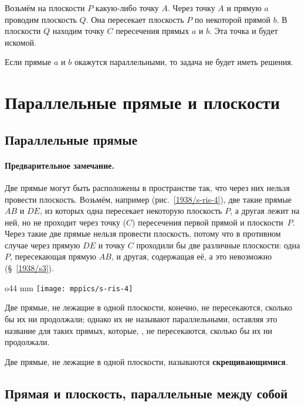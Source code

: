 Возьмём на плоскости $P$ какую-либо точку $A$.
Через точку $A$ и прямую $a$ проводим плоскость $Q$.
Она пересекает плоскость $P$ по некоторой прямой $b$.
В плоскости $Q$ находим точку $C$ пересечения прямых $a$ и $b$.
Эта точка и будет искомой.

Если прямые $a$ и $b$ окажутся параллельными, то задача не будет иметь решения.



\section{Параллельные прямые и плоскости}

\subsection*{Параллельные прямые}

\paragraph{Предварительное замечание.}\label{1938/s8}
Две прямые могут быть расположены в пространстве так, что через них нельзя провести плоскость.
Возьмём, например (рис.~\ref{1938/s-ris-4}), две такие прямые $AB$ и $DE$, из которых одна пересекает некоторую плоскость $P$, а другая лежит на ней, но не проходит через точку ($C$) пересечения первой прямой и плоскости~$P$.
Через такие две прямые нельзя провести плоскость, потому что в противном случае через прямую $DE$ и точку $C$ проходили бы две различные плоскости:
одна $P$, пересекающая прямую $AB$, и другая, содержащая её, а это невозможно (§~\ref{1938/s3}).

\begin{wrapfigure}{o}{44 mm}
\centering
\texttt{[image: mppics/s-ris-4]}
\caption{}\label{1938/s-ris-4}
\end{wrapfigure}

Две прямые, не лежащие в одной плоскости, конечно, не пересекаются, сколько бы их ни продолжали;
однако их не называют параллельными, оставляя это название для таких прямых, которые, , не пересекаются, сколько бы их ни продолжали.

Две прямые, не лежащие в одной плоскости, называются \textbf{скрещивающимися}.

\subsection*{Прямая и плоскость, параллельные между собой}

